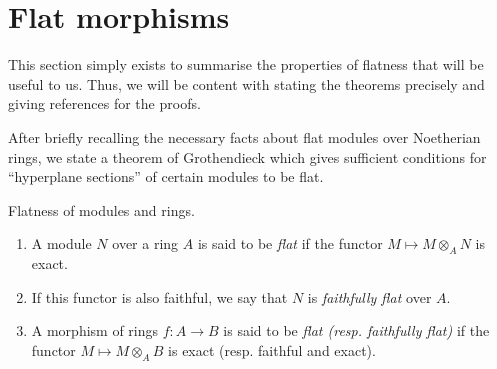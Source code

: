 \section{Flat morphisms}
\label{section-flat-moprhisms}

\noindent
This section simply exists to summarise the properties of flatness that will
be useful to us. Thus, we will be content with stating the theorems precisely
and giving references for the proofs.

\medskip\noindent
After briefly recalling the necessary facts about flat modules over Noetherian
rings, we state a theorem of Grothendieck which gives sufficient conditions
for ``hyperplane sections'' of certain modules to be flat.

\begin{definition}
\label{definition-flat-rings}
Flatness of modules and rings.
\begin{enumerate}
\item A module $N$ over a ring $A$ is said to be {\it flat}
if the functor $M \mapsto M \otimes_A N$ is exact.
\item If this functor is also faithful, we say that
$N$ is {\it faithfully flat} over $A$.
\item A morphism of rings $f : A \to B$ is said to be
{\it flat (resp. faithfully flat)}
if the functor $M \mapsto M \otimes_A B$ is exact
(resp. faithful and exact).
\end{enumerate}
\end{definition}

